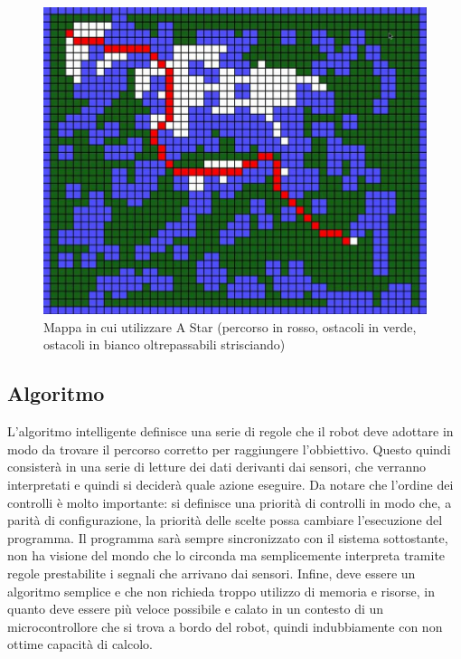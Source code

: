 \documentclass[a4paper,titlepage]{book}
\begin{document}
\begin{figure}[htbp]
\centering
\includegraphics[scale=0.3]{a_star.jpg}
\caption{Mappa in cui utilizzare A Star (percorso in rosso, ostacoli in verde, ostacoli in bianco oltrepassabili strisciando)}\label{fig:8}
\end{figure}

\subsection{Algoritmo}

L'algoritmo intelligente definisce una serie di regole che il robot deve adottare in modo da trovare il percorso corretto per raggiungere l'obbiettivo. Questo quindi consisterà in una serie di letture dei dati derivanti dai sensori, che verranno interpretati e quindi si deciderà quale azione eseguire. Da notare che l'ordine dei controlli è molto importante: si definisce una priorità di controlli in modo che, a parità di configurazione, la priorità delle scelte possa cambiare l'esecuzione del programma.
Il programma sarà sempre sincronizzato con il sistema sottostante, non ha visione del mondo che lo circonda ma semplicemente interpreta tramite regole prestabilite i segnali che arrivano dai sensori. Infine, deve essere un algoritmo semplice e che non richieda troppo utilizzo di memoria e risorse, in quanto deve essere più veloce possibile e calato in un contesto di un microcontrollore che si trova a bordo del robot, quindi indubbiamente con non ottime capacità di calcolo.
\end{document}
